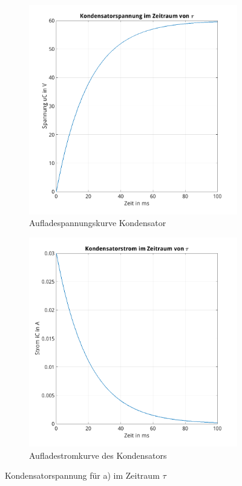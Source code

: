 \documentclass{article}
\begin{document}
\begin{figure}[h]
\centering
    \begin{subfigure}[b]{0.4\textwidth}
    \centering
    \includegraphics[width=\textwidth]{../assets/images/ET2P5/Kondensatorspannung11.png}
    \caption{Aufladespannungskurve Kondensator}
  \end{subfigure}
  \hfill
  \begin{subfigure}[b]{0.4\textwidth}
    \centering
    \includegraphics[width=\textwidth]{../assets/images/ET2P5/Kondensatorstrom11.png}
    \caption{Aufladestromkurve des Kondensators}
  \end{subfigure}

  \caption{Kondensatorspannung für a) im Zeitraum $\tau$}
  \label{fig:con1}
\end{figure}
\end{document}
